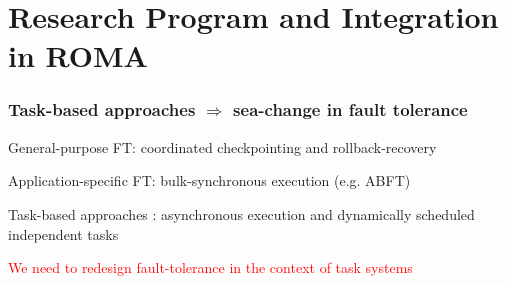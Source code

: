 \section{Research Program and Integration in ROMA}

\begin{frame}
  \frametitle{Task-based approaches $\Rightarrow$ sea-change in fault tolerance}

  General-purpose FT: coordinated checkpointing and rollback-recovery

  Application-specific FT: bulk-synchronous execution (e.g. ABFT)

  \bigskip
  
  Task-based approaches : asynchronous execution and dynamically scheduled independent tasks

  \bigskip
  
  \begin{center}
    \textcolor{red}{We need to redesign fault-tolerance in the context of task systems}
  \end{center}

\end{frame}




